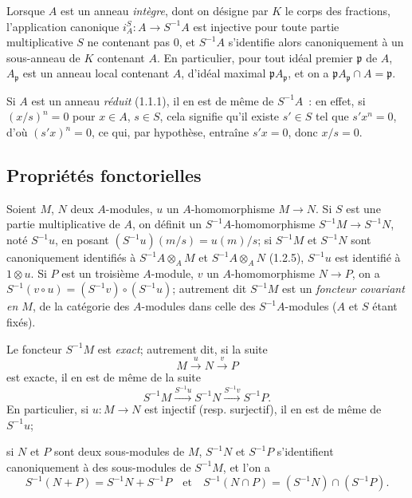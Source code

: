 \begin{env}[1.2.7]
\label{0.1.2.7-fr}
Lorsque $A$ est un anneau \emph{intègre}, dont on désigne par $K$ le corps des fractions, l'application canonique $i_A^S:A\to S^{-1}A$ est injective pour toute partie multiplicative $S$ ne contenant pas $0$, et $S^{-1}A$ s'identifie alors canoniquement à un sous-anneau de $K$ contenant $A$.
En particulier, pour tout idéal premier $\mathfrak{p}$ de $A$, $A_{\mathfrak{p}}$ est un anneau local contenant $A$, d'idéal maximal $\mathfrak{p}A_{\mathfrak{p}}$, et on a $\mathfrak{p}A_{\mathfrak{p}}\cap A=\mathfrak{p}$.
\end{env}

\begin{env}[1.2.8]
\label{0.1.2.8-fr}
Si $A$ est un anneau \emph{réduit} (1.1.1), il en est de même de $S^{-1}A$~: en effet, si $(x/s)^n=0$ pour $x\in A$, $s\in S$, cela signifie qu'il existe $s'\in S$ tel que $s'x^n=0$, d'où $(s'x)^n=0$, ce qui, par hypothèse, entraîne $s'x=0$, donc $x/s=0$.
\end{env}

\subsection{Propriétés fonctorielles}
\label{subsection:0.1.3-fr}

\begin{env}[1.3.1]
\label{0.1.3.1-fr}
Soient $M$, $N$ deux $A$-modules, $u$ un $A$-homomorphisme $M\to N$.
Si $S$ est une partie multiplicative de $A$, on définit un $S^{-1}A$-homomorphisme $S^{-1}M\to S^{-1}N$, noté $S^{-1}u$, en posant $(S^{-1}u)(m/s)=u(m)/s$; si $S^{-1}M$ et $S^{-1}N$ sont canoniquement identifiés à $S^{-1}A\otimes_A M$ et $S^{-1}A\otimes_A N$ (1.2.5), $S^{-1}u$ est identifié à $1\otimes u$.
Si $P$ est un troisième $A$-module, $v$ un $A$-homomorphisme $N\to P$, on a $S^{-1}(v\circ u)=(S^{-1}v)\circ(S^{-1}u)$; autrement dit $S^{-1}M$ est un \emph{foncteur covariant en $M$}, de la catégorie des $A$-modules dans celle des $S^{-1}A$-modules ($A$ et $S$ étant fixés).
\end{env}

\begin{env}[1.3.2]
\label{0.1.3.2-fr}
Le foncteur $S^{-1}M$ est \emph{exact}; autrement dit, si la suite
\[
  M\xrightarrow{u}N\xrightarrow{v}P
\]
est exacte, il en est de même de la suite
\[
  S^{-1}M\xrightarrow{S^{-1}u}S^{-1}N\xrightarrow{S^{-1}v}S^{-1}P.
\]
En particulier, si $u:M\to N$ est injectif (resp. surjectif), il en est de même de $S^{-1}u$;

si $N$ et $P$ sont deux sous-modules de $M$, $S^{-1}N$ et $S^{-1}P$ s'identifient canoniquement à des sous-modules de $S^{-1}M$, et l'on a
\[
  S^{-1}(N+P)=S^{-1}N+S^{-1}P
  \quad\text{et}\quad
  S^{-1}(N\cap P)=(S^{-1}N)\cap(S^{-1}P).
\]
\end{env}

